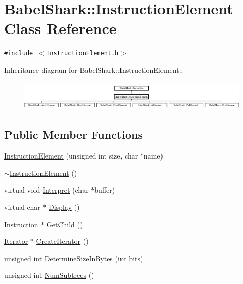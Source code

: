 \hypertarget{class_babel_shark_1_1_instruction_element}{
\section{BabelShark::InstructionElement Class Reference}
\label{class_babel_shark_1_1_instruction_element}
}
{\tt \#include $<$InstructionElement.h$>$}

Inheritance diagram for BabelShark::InstructionElement::\begin{figure}[H]
\begin{center}
\leavevmode
\includegraphics[height=1.45078cm]{class_babel_shark_1_1_instruction_element}
\end{center}
\end{figure}
\subsection*{Public Member Functions}
\begin{CompactItemize}
\item 
\hyperlink{class_babel_shark_1_1_instruction_element_1eba7f61aa5a545d9a18c5f43260a183}{InstructionElement} (unsigned int size, char $\ast$name)
\item 
\hyperlink{class_babel_shark_1_1_instruction_element_f1cfd6c4aa3851ea72839b8486f6861f}{$\sim$InstructionElement} ()
\item 
virtual void \hyperlink{class_babel_shark_1_1_instruction_element_7795ad0b2acedb5a2b68d2c3e63351ae}{Interpret} (char $\ast$buffer)
\item 
virtual char $\ast$ \hyperlink{class_babel_shark_1_1_instruction_element_6c98ad187a2a12399eb90a8cf9e2aec0}{Display} ()
\item 
\hyperlink{class_babel_shark_1_1_instruction}{Instruction} $\ast$ \hyperlink{class_babel_shark_1_1_instruction_element_747402ebce23651b77cad508c223ba62}{GetChild} ()
\item 
\hyperlink{class_babel_shark_1_1_iterator}{Iterator} $\ast$ \hyperlink{class_babel_shark_1_1_instruction_element_dfff8921ea8a00004193d2fec17e9a04}{CreateIterator} ()
\item 
unsigned int \hyperlink{class_babel_shark_1_1_instruction_element_db84b955eae4071334e72bfb8b15145d}{DetermineSizeInBytes} (int bits)
\item 
unsigned int \hyperlink{class_babel_shark_1_1_instruction_element_a99dae4733a6937c0d7f0232526b8db5}{NumSubtrees} ()
\end{CompactItemize}
